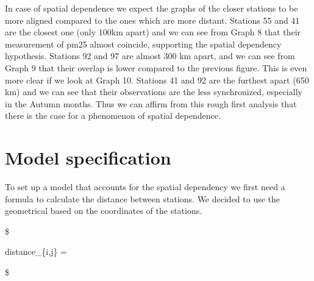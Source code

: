 \documentclass[
]{article}
\begin{document}
In case of spatial dependence we expect the graphs of the closer
stations to be more aligned compared to the ones which are more distant.
Stations 55 and 41 are the closest one (only 100km apart) and we can see
from Graph 8 that their measurement of pm25 almost coincide, supporting
the spatial dependency hypothesis. Stations 92 and 97 are almost 300 km
apart, and we can see from Graph 9 that their overlap is lower compared
to the previous figure. This is even more clear if we look at Graph 10.
Stations 41 and 92 are the furthest apart (650 km) and we can see that
their observations are the less synchronized, especially in the Autumn
months. Thus we can affirm from this rough first analysis that there is
the case for a phenomenon of spatial dependence.

\hypertarget{model-specification}{%
\section{Model specification}\label{model-specification}}

To set up a model that accounts for the spatial dependency we first need
a formula to calculate the distance between stations. We decided to use
the geometrical based on the coordinates of the stations.

\$

distance\_\{i,j\} =

\$
\end{document}
